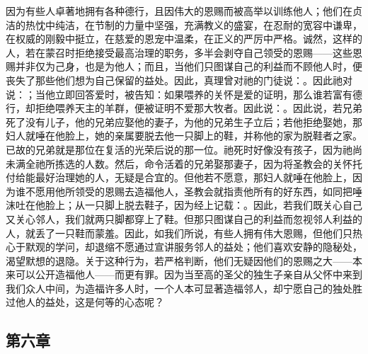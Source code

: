 因为有些人卓著地拥有各种德行，且因伟大的恩赐而被高举以训练他人；他们在贞洁的热忱中纯洁，在节制的力量中坚强，充满教义的盛宴，在忍耐的宽容中谦卑，在权威的刚毅中挺立，在慈爱的恩宠中温柔，在正义的严厉中严格。诚然，这样的人，若在蒙召时拒绝接受最高治理的职务，多半会剥夺自己领受的恩赐——这些恩赐并非仅为己身，也是为他人；而且，当他们只图谋自己的利益而不顾他人时，便丧失了那些他们想为自己保留的益处。因此，真理曾对祂的门徒说：。因此祂对说：；当他立即回答爱时，被告知：如果喂养的关怀是爱的证明，那么谁若富有德行，却拒绝喂养天主的羊群，便被证明不爱那大牧者。因此说：。因此说，若兄弟死了没有儿子，他的兄弟应娶他的妻子，为他的兄弟生子立后；若他拒绝娶她，那妇人就唾在他脸上，她的亲属要脱去他一只脚上的鞋，并称他的家为脱鞋者之家。已故的兄弟就是那位在复活的光荣后说的那一位。祂死时好像没有孩子，因为祂尚未满全祂所拣选的人数。然后，命令活着的兄弟娶那妻子，因为将圣教会的关怀托付给能最好治理她的人，无疑是合宜的。但他若不愿意，那妇人就唾在他脸上，因为谁不愿用他所领受的恩赐去造福他人，圣教会就指责他所有的好东西，如同把唾沫吐在他脸上；从一只脚上脱去鞋子，因为经上记载：。因此，若我们既关心自己又关心邻人，我们就两只脚都穿上了鞋。但那只图谋自己的利益而忽视邻人利益的人，就丢了一只鞋而蒙羞。因此，如我们所说，有些人拥有伟大恩赐，但他们只热心于默观的学问，却退缩不愿通过宣讲服务邻人的益处；他们喜欢安静的隐秘处，渴望默想的退隐。关于这种行为，若严格判断，他们无疑因他们的恩赐之大——本来可以公开造福他人——而更有罪。因为当至高的圣父的独生子亲自从父怀中来到我们众人中间，为造福许多人时，一个人本可显著造福邻人，却宁愿自己的独处胜过他人的益处，这是何等的心态呢？\par


\subsection{第六章}

\par


